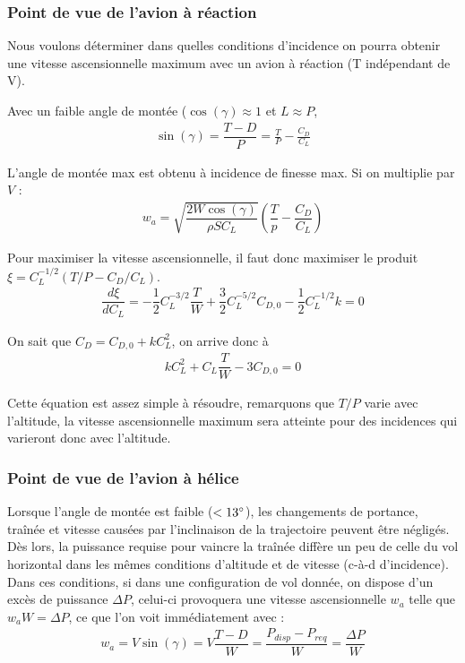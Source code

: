 \documentclass{report}
\begin{document}
\subsubsection{Point de vue de l'avion à réaction}

Nous voulons déterminer dans quelles conditions d'incidence on pourra obtenir une vitesse ascensionnelle maximum avec un avion à réaction (T indépendant de V).

Avec un faible angle de montée ($\cos(\gamma)\approx 1$ et $L\approx P$,
\begin{eqnarray}
\sin(\gamma) = \dfrac{T-D}{P}=\frac{T}{P}-\frac{C_D}{C_L}
\end{eqnarray}

L'angle de montée max est obtenu à incidence de finesse max. Si on multiplie par $V$ :
\begin{eqnarray}
w_a = \sqrt{\dfrac{2W\cos(\gamma)}{\rho SC_L}}\left(\dfrac{T}{p}-\dfrac{C_D}{C_L}\right)
\end{eqnarray}

Pour maximiser la vitesse ascensionnelle, il faut donc maximiser le produit $\xi =C_L^{-1/2}(T/P-C_D/C_L)$.
\begin{eqnarray}
\dfrac{d\xi}{dC_L}=-\dfrac{1}{2}C_L^{-3/2}\dfrac{T}{W}+\dfrac{3}{2}C_L^{-5/2}C_{D,0}-\dfrac{1}{2}C_L^{-1/2}k=0
\end{eqnarray}

On sait que $C_D=C_{D,0}+kC_L^2$, on arrive donc à
\begin{eqnarray}
kC_L^2+C_L\dfrac{T}{W}-3C_{D,0}=0
\end{eqnarray}

Cette équation est assez simple à résoudre, remarquons que $T/P$ varie avec l'altitude, la vitesse ascensionnelle maximum sera atteinte pour des incidences qui varieront donc avec l'altitude.

\subsubsection{Point de vue de l'avion à hélice}

Lorsque l'angle de montée est faible ($<13\degree$), les changements de portance, traînée et vitesse causées par l'inclinaison de la trajectoire peuvent être négligés. Dès lors, la puissance requise pour vaincre la traînée diffère un peu de celle du vol horizontal dans les mêmes conditions d'altitude et de vitesse (c-à-d d'incidence). Dans ces conditions, si dans une configuration de vol donnée, on dispose d'un excès de puissance $\Delta P$, celui-ci provoquera une vitesse ascensionnelle $w_a$ telle que $w_aW=\Delta P$, ce que l'on voit immédiatement avec :
\begin{eqnarray}
w_a = V\sin(\gamma)=V\dfrac{T-D}{W}=\dfrac{P_{disp}-P_{req}}{W}=\dfrac{\Delta P}{W}
\end{eqnarray}
\end{document}

